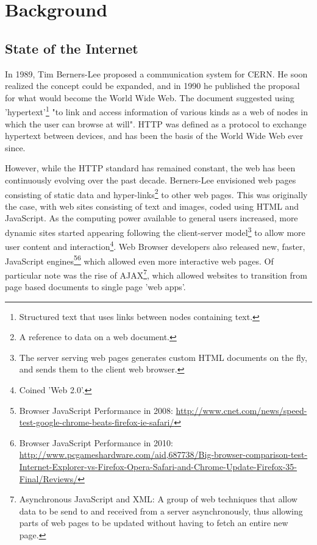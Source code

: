\chapter{Background}

\section{State of the Internet}
In 1989, Tim Berners-Lee proposed a communication system for CERN\cite{informationproposal}. He soon realized the concept could be expanded, and in 1990 he published the proposal for what would become the World Wide Web\cite{wwwproposol}. The document suggested using 'hypertext'\footnote{Structured text that uses links between nodes containing text.} "to link and access information of various kinds as a web of nodes in which the user can browse at will". HTTP was defined as a protocol to exchange hypertext between devices\cite{rfc2616}, and has been the basis of the World Wide Web ever since.

However, while the HTTP standard has remained constant, the web has been continuously evolving over the past decade. Berners-Lee envisioned web pages consisting of static data and hyper-links\footnote{A reference to data on a web document.} to other web pages. This was originally the case, with web sites consisting of text and images, coded using HTML and JavaScript. As the computing power available to general users increased, more dynamic sites started appearing following the client-server model\footnote{The server serving web pages generates custom HTML documents on the fly, and sends them to the client web browser.} to allow more user content and interaction\footnote{Coined 'Web 2.0'.}. Web Browser developers also released new, faster, JavaScript engines\footnote{Browser JavaScript Performance in 2008: \url{http://www.cnet.com/news/speed-test-google-chrome-beats-firefox-ie-safari/}}\footnote{Browser JavaScript Performance in 2010: \url{http://www.pcgameshardware.com/aid,687738/Big-browser-comparison-test-Internet-Explorer-vs-Firefox-Opera-Safari-and-Chrome-Update-Firefox-35-Final/Reviews/}} which allowed even more interactive web pages. Of particular note was the rise of AJAX\footnote{Asynchronous JavaScript and XML: A group of web techniques that allow data to be send to and received from a server asynchronously, thus allowing parts of web pages to be updated without having to fetch an entire new page.}, which allowed websites to transition from page based documents to single page 'web apps'.

